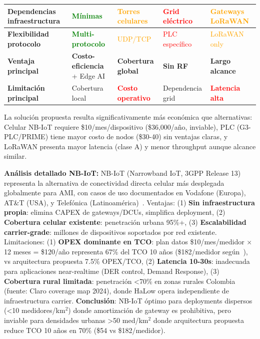 \begin{table}[H]
{\begin{tabular}{|>{\centering\arraybackslash}p{2.8cm}|>{\centering\arraybackslash}p{2.5cm}|>{\centering\arraybackslash}p{2.5cm}|>{\centering\arraybackslash}p{2.5cm}|>{\centering\arraybackslash}p{3cm}|}
\hline
\textbf{Dependencias infraestructura} & \textcolor{green}{\textbf{Mínimas}} & \textcolor{orange}{Torres celulares} & \textcolor{red}{Grid eléctrico} & \textcolor{orange}{Gateways LoRaWAN} \\
\hline
\textbf{Flexibilidad protocolo} & \textcolor{green}{\textbf{Multi-protocolo}} & \textcolor{orange}{UDP/TCP} & \textcolor{red}{PLC específico} & \textcolor{orange}{LoRaWAN only} \\
\hline
\rowcolor{yellow!20}
\textbf{Ventaja principal} & \textbf{Costo-eficiencia} + Edge AI & \textbf{Cobertura global} & \textbf{Sin RF} & \textbf{Largo alcance} \\
\hline
\rowcolor{red!20}
\textbf{Limitación principal} & Cobertura local & \textcolor{red}{\textbf{Costo operativo}} & Dependencia grid & \textcolor{red}{\textbf{Latencia alta}} \\
\hline
\end{tabular}%
}
\end{table}

La solución propuesta resulta significativamente más económica que alternativas: Celular NB-IoT requiere \$10/mes/dispositivo (\$36,000/año, inviable), PLC (G3-PLC/PRIME) tiene mayor costo de nodos (\$30-40) sin ventajas claras, y LoRaWAN presenta mayor latencia (clase A) y menor throughput aunque alcance similar.

\textbf{Análisis detallado NB-IoT:} NB-IoT (Narrowband IoT, 3GPP Release 13) representa la alternativa de conectividad directa celular más desplegada globalmente para AMI, con casos de uso documentados en Vodafone (Europa), AT\&T (USA), y Telefónica (Latinoamérica)~\cite{NBIoT-AMI-TCO-2024}. Ventajas: (1) \textbf{Sin infraestructura propia}: elimina CAPEX de gateways/DCUs, simplifica deployment, (2) \textbf{Cobertura celular existente}: penetración urbana 95\%+, (3) \textbf{Escalabilidad carrier-grade}: millones de dispositivos soportados por red existente. Limitaciones: (1) \textbf{OPEX dominante en TCO}: plan datos \$10/mes/medidor $\times$ 12 meses = \$120/año representa 67\% del TCO 10 años (\$182/medidor según~\cite{NBIoT-AMI-TCO-2024}), vs arquitectura propuesta 7.5\% OPEX/TCO, (2) \textbf{Latencia 10-30s}: inadecuada para aplicaciones near-realtime (DER control, Demand Response), (3) \textbf{Cobertura rural limitada}: penetración <70\% en zonas rurales Colombia (fuente: Claro coverage map 2024), donde HaLow opera independiente de infraestructura carrier. \textbf{Conclusión}: NB-IoT óptimo para deployments dispersos (<10 medidores/km$^2$) donde amortización de gateway es prohibitiva, pero inviable para densidades urbanas >50 med/km$^2$ donde arquitectura propuesta reduce TCO 10 años en 70\% (\$54 vs \$182/medidor).


